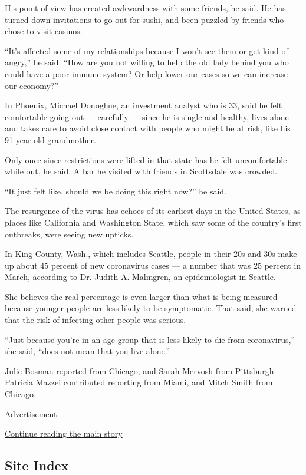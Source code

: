 His point of view has created awkwardness with some friends, he said. He
has turned down invitations to go out for sushi, and been puzzled by
friends who chose to visit casinos.

``It's affected some of my relationships because I won't see them or get
kind of angry,'' he said. ``How are you not willing to help the old lady
behind you who could have a poor immune system? Or help lower our cases
so we can increase our economy?''

In Phoenix, Michael Donoghue, an investment analyst who is 33, said he
felt comfortable going out --- carefully --- since he is single and
healthy, lives alone and takes care to avoid close contact with people
who might be at risk, like his 91-year-old grandmother.

Only once since restrictions were lifted in that state has he felt
uncomfortable while out, he said. A bar he visited with friends in
Scottsdale was crowded.

``It just felt like, should we be doing this right now?'' he said.

The resurgence of the virus has echoes of its earliest days in the
United States, as places like California and Washington State, which saw
some of the country's first outbreaks, were seeing new upticks.

In King County, Wash., which includes Seattle, people in their 20s and
30s make up about 45 percent of new coronavirus cases --- a number that
was 25 percent in March, according to Dr. Judith A. Malmgren, an
epidemiologist in Seattle.

She believes the real percentage is even larger than what is being
measured because younger people are less likely to be symptomatic. That
said, she warned that the risk of infecting other people was serious.

``Just because you're in an age group that is less likely to die from
coronavirus,'' she said, ``does not mean that you live alone.''

Julie Bosman reported from Chicago, and Sarah Mervosh from Pittsburgh.
Patricia Mazzei contributed reporting from Miami, and Mitch Smith from
Chicago.

Advertisement

\protect\hyperlink{after-bottom}{Continue reading the main story}

\hypertarget{site-index}{%
\subsection{Site Index}\label{site-index}}

